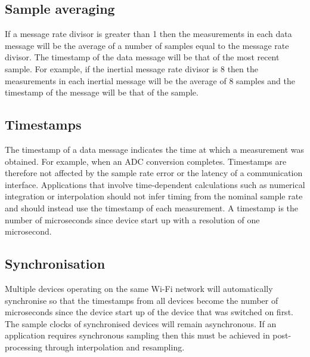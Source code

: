 \subsection{Sample averaging}

If a message rate divisor is greater than 1 then the measurements in each data message will be the average of a number of samples equal to the message rate divisor.  The timestamp of the data message will be that of the most recent sample.  For example, if the inertial message rate divisor is 8 then the measurements in each inertial message will be the average of 8 samples and the timestamp of the message will be that of the  sample.

\subsection{Timestamps}

The timestamp of a data message indicates the time at which a measurement was obtained.  For example, when an \ac{ADC} conversion completes.  Timestamps are therefore not affected by the sample rate error or the latency of a communication interface.  Applications that involve time-dependent calculations such as numerical integration or interpolation should not infer timing from the nominal sample rate and should instead use the timestamp of each measurement.  A timestamp is the number of microseconds since device start up with a resolution of one microsecond.

\subsection{Synchronisation}

Multiple devices operating on the same Wi-Fi network will automatically synchronise so that the timestamps from all devices become the number of microseconds since the device start up of the device that was switched on first.  The sample clocks of synchronised devices will remain asynchronous.  If an application requires synchronous sampling then this must be achieved in post-processing through interpolation and resampling.
